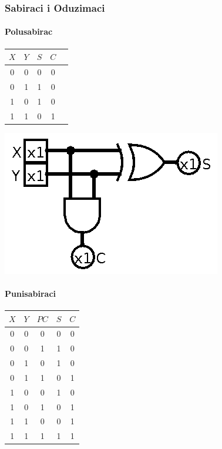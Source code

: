 \documentclass[12p,a4paper]{article}
\begin{document}
\begin{multicols}{2}
    \subsubsection{Sabiraci i Oduzimaci}

    \paragraph{Polusabirac}

    \begin{tabular}{*{5}{c}}
        $X$ & $Y$ & $S$ & $C$ \\
        \midrule
         0  &  0  &  0  &  0  \\
         0  &  1  &  1  &  0  \\
         1  &  0  &  1  &  0  \\
         1  &  1  &  0  &  1  \\
    \end{tabular}

    \includegraphics[width=0.5\columnwidth]{Figures/half_adder.png}

    \paragraph{Punisabiraci}

    \begin{tabular}{*{5}{c}}
        $X$ & $Y$ & $PC$ & $S$ & $C$ \\
        \midrule
         0  &  0 &  0  &  0  &  0  \\
         0  &  0 &  1  &  1  &  0  \\
         0  &  1 &  0  &  1  &  0  \\
         0  &  1 &  1  &  0  &  1  \\
         1  &  0 &  0  &  1  &  0  \\
         1  &  0 &  1  &  0  &  1  \\
         1  &  1 &  0  &  0  &  1  \\
         1  &  1 &  1  &  1  &  1  \\
    \end{tabular}


\end{multicols}
\end{document}
